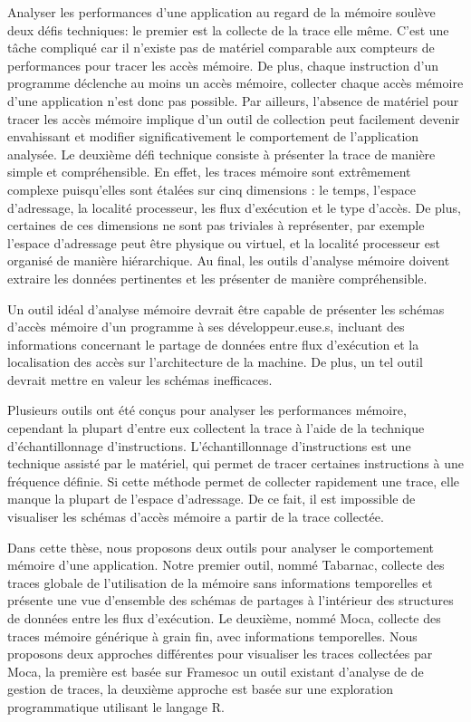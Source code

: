 Analyser les performances d'une application au regard de la mémoire soulève deux défis techniques: le premier est la collecte de la trace elle même.
C'est une t\^ache compliqué car il n'existe pas de matériel comparable aux compteurs de performances pour tracer les accès mémoire.
De plus, chaque instruction d'un programme déclenche au moins un accès mémoire, collecter chaque accès mémoire d'une application n'est donc pas possible.
Par ailleurs, l'absence de matériel pour tracer les accès mémoire implique d'un outil de collection peut facilement devenir envahissant et modifier  significativement le comportement de l'application analysée.
Le deuxième défi technique consiste à présenter la trace de manière simple et compréhensible.
En effet, les traces mémoire sont extrêmement complexe puisqu'elles sont étalées sur cinq dimensions : le temps, l'espace d'adressage, la localité processeur, les flux d'exécution et le type d'accès.
De plus, certaines de ces dimensions ne sont pas triviales à représenter, par exemple l'espace d'adressage peut être physique ou virtuel, et la localité processeur est organisé de manière hiérarchique.
Au final, les outils d'analyse mémoire doivent extraire les données pertinentes et les présenter de manière compréhensible.

Un outil idéal d'analyse mémoire devrait être capable de présenter les schémas d'accès mémoire d'un programme à ses développeur.euse.s, incluant des informations concernant le partage de données entre flux d'exécution et la localisation des accès  sur l'architecture de la machine.
De plus, un tel outil devrait mettre en valeur les schémas inefficaces.

Plusieurs outils ont été conçus pour analyser les performances mémoire, cependant la plupart d'entre eux collectent la trace à l'aide de la technique d'échantillonnage d'instructions.
L'échantillonnage d'instructions est une technique assisté par le matériel, qui permet de tracer certaines instructions à une fréquence définie.
Si cette méthode permet de collecter rapidement une trace, elle manque la plupart de l'espace d'adressage.
De ce fait, il est impossible de visualiser les schémas d'accès mémoire a partir de la trace collectée.

Dans cette thèse, nous proposons deux outils pour analyser le comportement mémoire d'une application.
Notre premier outil, nommé \acrfull{Tabarnac}, collecte des traces globale de l'utilisation de la mémoire sans informations temporelles et présente une vue d'ensemble des schémas de partages à l'intérieur des structures de données entre les flux d'exécution.
Le deuxième, nommé \acrfull{Moca}, collecte des traces mémoire générique à grain fin, avec informations temporelles.
Nous proposons deux approches différentes pour visualiser les traces collectées par \gls{Moca}, la première est basée sur \gls{Framesoc} un outil existant d'analyse de de gestion de traces, la deuxième approche est basée sur une exploration programmatique utilisant le langage R.

